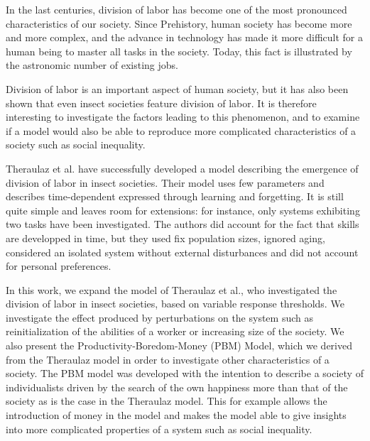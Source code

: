 In the last centuries, division of labor has become one of the most pronounced characteristics of our society. Since Prehistory, human society has become more and more complex, and the advance in technology has made it more difficult for a human being to master all tasks in the society. Today, this fact is illustrated by the astronomic number of existing jobs.

Division of labor is an important aspect of human society, but it has also been shown that even insect societies feature division of labor\cite{robinson}. 
It is therefore interesting to investigate the factors leading to this phenomenon, and to examine if a model would also be able to reproduce more complicated characteristics of a society such as social inequality. 

Theraulaz et al. have successfully developed a model describing the emergence of division of labor in insect societies\cite{theraulaz}. 
Their model uses few parameters and describes time-dependent expressed through learning and forgetting. It is still quite simple and leaves room for extensions: for instance, only systems exhibiting two tasks have been investigated. The authors did account for the fact that skills are developped in time, but they used fix population sizes, ignored aging, considered an isolated system without external disturbances and did not account for personal preferences. 

In this work, we expand the model of Theraulaz et al., who investigated the division of labor in insect societies, based on variable response thresholds. We investigate the effect produced by perturbations on the system such as reinitialization of the abilities of a worker or increasing size of the society.
We also present the Productivity-Boredom-Money (PBM) Model, which we derived from the Theraulaz model in order to investigate other characteristics of a society. The PBM model was developed with the intention to describe a society of individualists driven by the search of the own happiness more than that of the society as is the case in the Theraulaz model. This for example allows the introduction of money in the model and makes the model able to give insights into more complicated properties of a system such as social inequality.
